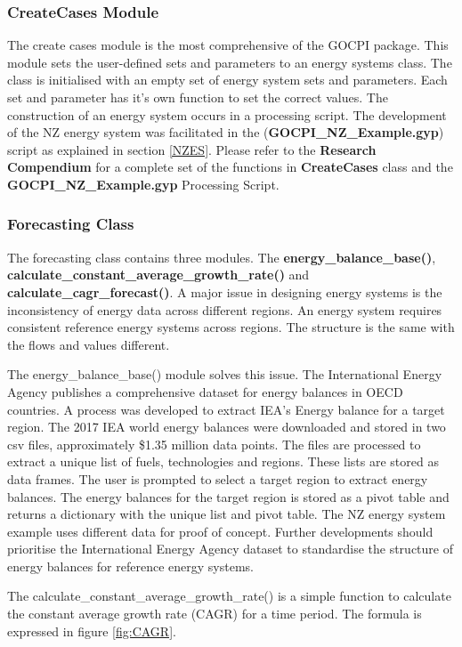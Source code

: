 \documentclass[12pt]{article}
\begin{document}
\subsubsection{CreateCases Module}
The create cases module is the most comprehensive of the GOCPI package.
This module sets the user-defined sets and parameters to an energy systems class.
The class is initialised with an empty set of energy system sets and parameters. 
Each set and parameter has it's own function to set the correct values.
The construction of an energy system occurs in a processing script.
The development of the NZ energy system was facilitated in the (\textbf{GOCPI\_NZ\_Example.gyp}) script as explained in section \ref{NZES}.
Please refer to the \textbf{Research Compendium} for a complete set of the functions in \textbf{CreateCases} class and the \textbf{GOCPI\_NZ\_Example.gyp} Processing Script.

\subsubsection{Forecasting Class}
The forecasting class contains three modules. The \textbf{energy\_balance\_base()}, \textbf{calculate\_constant\_average\_growth\_rate()} and \textbf{calculate\_cagr\_forecast()}.
A major issue in designing energy systems is the inconsistency of energy data across different regions.
An energy system requires consistent reference energy systems across regions. The structure is the same with the flows and values different.

The energy\_balance\_base() module solves this issue.
The International Energy Agency publishes a comprehensive dataset for energy balances in OECD countries. 
A process was developed to extract IEA's Energy balance for a target region.
The 2017 IEA world energy balances were downloaded and stored in two csv files, approximately \$1.35 million data points.
The files are processed to extract a unique list of fuels, technologies and regions.
These lists are stored as data frames. The user is prompted to select a target region to extract energy balances.
The energy balances for the target region is stored as a pivot table and returns a dictionary with the unique list and pivot table.
The NZ energy system example uses different data for proof of concept. 
Further developments should prioritise the International Energy Agency dataset to standardise the structure of energy balances for reference energy systems.

The calculate\_constant\_average\_growth\_rate() is a simple function to calculate the constant average growth rate (CAGR) for a time period.
The formula is expressed in figure \ref{fig:CAGR}.
\end{document}
